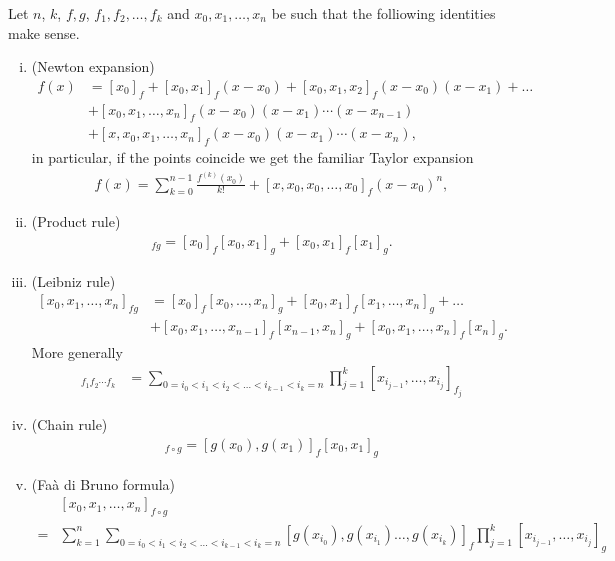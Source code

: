 \begin{prop}
	Let $n$, $k$, $f, g$, $f_{1}, f_{2}, \ldots, f_{k}$ and $x_{0}, x_{1}, \ldots, x_{n}$ be such that the folliowing identities make sense.
	\begin{enumerate}[(i)]
		\item (Newton expansion)
		\begin{align}\label{newton_expansion}
			f(x) &= [x_{0}]_{f} + [x_{0}, x_{1}]_{f} (x - x_{0})  + [x_{0}, x_{1}, x_{2}]_{f} (x - x_{0}) (x - x_{1}) + \ldots \\
			& + [x_{0}, x_{1}, \ldots, x_{n}]_{f} (x - x_{0}) (x - x_{1}) \cdots (x - x_{n - 1}) \nonumber\\
			& + [x, x_{0}, x_{1}, \ldots, x_{n}]_{f} (x - x_{0}) (x - x_{1}) \cdots (x - x_{n}) \nonumber,
		\end{align}
		in particular, if the points coincide we get the familiar Taylor expansion
		\begin{align}\label{taylor_expansion}
			f(x) = \sum_{k = 0}^{n - 1} \frac{f^{(k)}(x_{0})}{k!} + [x, x_{0}, x_{0}, \ldots, x_{0}]_{f} (x - x_{0})^{n},
		\end{align}
		\item (Product rule)
		\begin{align*}
			[x_{0}, x_{1}]_{f g} = [x_{0}]_{f} [x_{0}, x_{1}]_{g} + [x_{0}, x_{1}]_{f} [x_{1}]_{g}.
		\end{align*}
		\item (Leibniz rule)
		\begin{align}\label{leibniz_rule}
			[x_{0}, x_{1}, \ldots, x_{n}]_{f g} &= [x_{0}]_{f} [x_{0}, \ldots, x_{n}]_{g} + [x_{0}, x_{1}]_{f} [x_{1}, \ldots, x_{n}]_{g} + \ldots\\
			&+ [x_{0}, x_{1}, \ldots, x_{n - 1}]_{f} [x_{n - 1}, x_{n}]_{g} + [x_{0}, x_{1}, \ldots, x_{n}]_{f} [x_{n}]_{g} \nonumber.
		\end{align}
		More generally
		\begin{align*}
			[x_{0}, x_{1}, \ldots, x_{n}]_{f_{1} f_{2} \cdots f_{k}} &= \sum_{0 = i_{0} < i_{1} < i_{2} < \ldots < i_{k - 1} < i_{k} = n} \prod_{j = 1}^{k} [x_{i_{j - 1}}, \ldots, x_{i_{j}}]_{f_{j}}
		\end{align*}
		\item (Chain rule)
		\begin{align*}
			[x_{0}, x_{1}]_{f \circ g} = [g(x_{0}), g(x_{1})]_{f} [x_{0}, x_{1}]_{g}
		\end{align*}
		\item (Fa\`{a} di Bruno formula)
		\begin{align*}
			& [x_{0}, x_{1}, \ldots, x_{n}]_{f \circ g} \\
			=& \sum_{k = 1}^{n} \sum_{0 = i_{0}< i_{1} < i_{2} < \ldots < i_{k - 1} < i_{k} =  n} [g(x_{i_{0}}), g(x_{i_{1}})\ldots , g(x_{i_{k}})]_{f} \prod_{j = 1}^{k} [x_{i_{j - 1}}, \ldots, x_{i_{j}}]_{g}
		\end{align*}
	\end{enumerate}
\end{prop}
